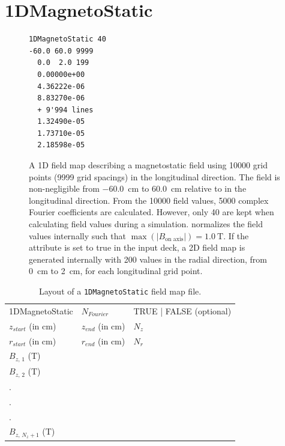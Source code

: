 \section{1DMagnetoStatic}
\label{sec:1DMagnetoStatic}
\begin{figure}[h]
  \begin{fmpage}
\begin{verbatim}
1DMagnetoStatic 40
-60.0 60.0 9999
  0.0  2.0 199
  0.00000e+00
  4.36222e-06
  8.83270e-06
  + 9'994 lines
  1.32490e-05
  1.73710e-05
  2.18598e-05
\end{verbatim}
  \end{fmpage}
  \caption[Example of a 1DMagnetoStatic field map]{A 1D field map describing a magnetostatic field using 10000 grid points
    (9999 grid spacings) in the longitudinal direction. The field is non-negligible from \SI{-60.0}{\centi\meter} to \SI{+60.0}{\centi\meter}
    relative to  in the longitudinal direction. From the 10000 field values, 5000 complex Fourier coefficients are
    calculated. However, only 40 are kept when calculating field values during a simulation. \opalt normalizes the field values
    internally such that $\max(|B_{\text{on axis}}|) = \SI{1.0}{\tesla}$. If the  attribute is set to true in the input
    deck, a 2D field map is generated internally with 200 values in the radial direction, from \SI{0}{\centi\meter} to \SI{2}{\centi\meter}, for each
    longitudinal grid point.}
  \label{fig:1DMagnetoStatic}
\end{figure}
\begin{table}[ht!]
    \caption{Layout of a \texttt{1DMagnetoStatic} field map file.}
    \label{tab:1DMagnetoStatic}
    \begin{center}
    \begin{tabular}{lll}
      \hline
      1DMagnetoStatic & $N_{Fourier}$ & TRUE | FALSE (optional) \\
      $z_{start}$ (in cm) & $z_{end}$ (in cm) & $N_{z}$ \\
      $r_{start}$ (in cm) & $r_{end}$ (in cm) & $N_{r}$ \\
      $B_{z,\,1}$ (T) & & \\
      $B_{z,\,2}$ (T) & & \\
      . & & \\
      . & & \\
      . & & \\
      $B_{z,\,N_{z} + 1}$ (T) & & \\
      \hline
    \end{tabular}
    \end{center}
\end{table}

